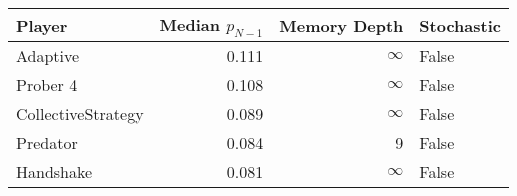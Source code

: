 \begin{tabular}{lrrl}
\toprule
             Player &  Median $p_{N-1}$ &  Memory Depth & Stochastic \\
\midrule
           Adaptive &             0.111 &            \(\infty\) &      False \\
           Prober 4 &             0.108 &            \(\infty\) &      False \\
 CollectiveStrategy &             0.089 &            \(\infty\) &      False \\
           Predator &             0.084 &             9 &      False \\
          Handshake &             0.081 &            \(\infty\) &      False \\
\bottomrule
\end{tabular}
